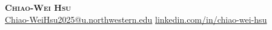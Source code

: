 \begin{center}
  \textbf{\Huge \scshape Chiao-Wei Hsu} \\ \vspace{5pt plus 2pt minus 2pt}
  \small \faPhone\hspace{1pt}  \hspace{10pt} \faEnvelope\hspace{2pt}\href{mailto:Chiao-WeiHsu2025@u.northwestern.edu} {Chiao-WeiHsu2025@u.northwestern.edu}
  \hspace{10pt} \faLinkedin\hspace{2pt}\href{https://linkedin.com/in/chiao-wei-hsu}{linkedin.com/in/chiao-wei-hsu}
\end{center}